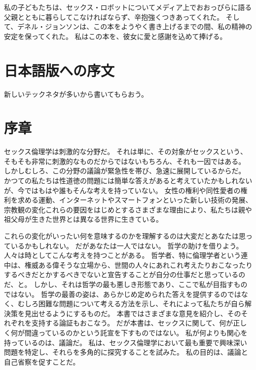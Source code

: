 \documentclass[paper=a4,book,openany]{jlreq} \usepackage{mystyle}
\begin{document}
私の子どもたちは、セックス・ロボットについてメディア上でおおっぴらに語る父親とともに暮らしてこなければならず、辛抱強くつきあってくれた。
そして、デネル・ジョンソンは、この本をようやく書き上げるまでの間、私の精神の安定を保ってくれた。
私はこの本を、彼女に愛と感謝を込めて捧げる。

\chapter*{日本語版への序文}

新しいテックネタが多いから書いてもらおう。
\fi
\mainmatter

\chapter*{序章}
{}

セックス倫理学は刺激的な分野だ。
それは単に、その対象がセックスという、そもそも非常に刺激的なものだからではない{\DDASH}もちろん、それも一因ではある。
しかしむしろ、この分野の議論が緊急性を帯び、急速に展開しているからだ。
かつての私たちは性道徳の問題には簡単な答えがあると考えていたかもしれないが、今ではもはや誰もそんな考えを持っていない。
女性の権利や同性愛者の権利を求める運動、インターネットやスマートフォンといった新しい技術の発展、宗教観の変化{\DDASH}これらの要因をはじめとするさまざまな理由により、私たちは親や祖父母が生きた世界とは異なる世界に生きている。

これらの変化がいったい何を意味するのかを理解するのは大変だとあなたは思っているかもしれない。
だがあなたは一人ではない。
哲学の助けを借りよう。
人々は時としてこんな考えを持つことがある。
哲学者、特に倫理学者という連中は、権威ある偉そうな立場から、世間の人々にあれこれ考えたりおこなったりするべきだとかするべきでないと宣告することが自分の仕事だと思っているのだ、と。
しかし、それは哲学の最も悪しき形態であり、ここで私が目指すものではない。
哲学の最善の姿は、あらかじめ定められた答えを提供するのではなく、むしろ困難な問題について考える方法を示し、それによって私たちが自ら解決策を見出せるようにするものだ。
本書ではさまざまな意見を紹介し、そのそれぞれを支持する論証もおこなう。
だが本書は、セックスに関して、何が正しく何が間違っているのかという託宣を下すものではない。
私が何よりも関心を持っているのは、議論だ。
私は、セックス倫理学において最も重要で興味深い問題を特定し、それらを多角的に探究することを試みた。
私の目的は、議論と自己省察を促すことだ。
\end{document}
